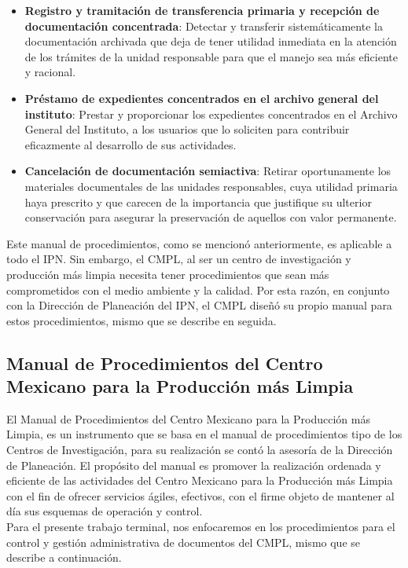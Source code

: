 \begin{itemize}
		\item  \textbf{Registro y tramitación de transferencia primaria y recepción de documentación concentrada}: Detectar y transferir sistemáticamente la documentación archivada que deja de tener utilidad inmediata en la atención de los trámites de la unidad responsable para que el manejo sea más eficiente y racional\cite{ManProcyArcIPN}.
		\item  \textbf{Préstamo de expedientes concentrados en el archivo general del instituto}: Prestar y proporcionar los expedientes concentrados en el Archivo General del Instituto, a los usuarios que lo soliciten para contribuir eficazmente al desarrollo de sus actividades\cite{ManProcyArcIPN}.
		\item  \textbf{Cancelación de documentación semiactiva}: Retirar oportunamente los materiales documentales de las unidades responsables, cuya utilidad primaria haya prescrito y que carecen de la importancia que justifique su ulterior conservación para asegurar la preservación de aquellos con valor permanente\cite{ManProcyArcIPN}.
	\end{itemize}
	
	Este manual de procedimientos, como se mencionó anteriormente, es aplicable a todo el IPN. Sin embargo, el CMPL, al ser un centro de investigación y producción más limpia necesita tener procedimientos que sean más comprometidos con el medio ambiente y la calidad. Por esta razón, en conjunto con la Dirección de Planeación del IPN, el CMPL diseñó su propio manual para estos procedimientos, mismo que se describe en seguida.	
	
	\subsection{Manual de Procedimientos del Centro Mexicano para la Producción más Limpia}
	El Manual de Procedimientos del Centro Mexicano para la Producción más Limpia, es un instrumento que se basa en el manual de procedimientos tipo de los Centros de Investigación, para su realización se contó la asesoría de la Dirección de Planeación. El propósito del manual es promover la realización ordenada y eficiente de las actividades del Centro Mexicano para la Producción más Limpia con el fin de ofrecer servicios ágiles, efectivos, con el firme objeto de mantener al día sus esquemas de operación y control\cite{ManProcCMPL}.\\
	
	Para el presente trabajo terminal, nos enfocaremos en los procedimientos para el control y gestión administrativa de documentos del CMPL, mismo que se describe a continuación.\\
	
